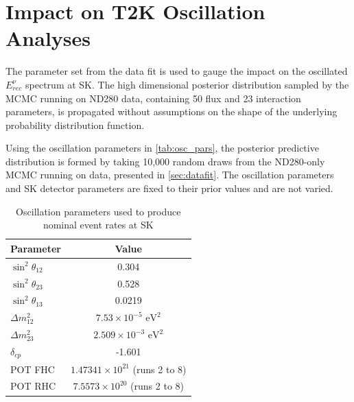 \section{Impact on T2K Oscillation Analyses}
The parameter set from the data fit is used to gauge the impact on the oscillated $E^\nu_{rec}$ spectrum at SK. The high dimensional posterior distribution sampled by the MCMC running on ND280 data, containing 50 flux and 23 interaction parameters, is propagated without assumptions on the shape of the underlying probability distribution function.

Using the oscillation parameters in \autoref{tab:osc_pars}, the posterior predictive distribution is formed by taking 10,000 random draws from the ND280-only MCMC running on data, presented in \autoref{sec:datafit}. The oscillation parameters and SK detector parameters are fixed to their prior values and are not varied.
\begin{table}[h]
	\begin{tabular}{l | c}
		\hline
		\hline
		Parameter & Value \\
		\hline
		$\sin^2\theta_{12}$ & 0.304 \\
		$\sin^2\theta_{23}$ & 0.528 \\
		$\sin^2\theta_{13}$ & 0.0219 \\
		$\Delta m^2_{12}$  & $7.53\times10^{-5} \text{ eV}^2$ \\
		$\Delta m^2_{23}$  & $2.509\times10^{-3} \text{ eV}^2$ \\
		$\delta_{cp}$ & -1.601 \\
		\hline
		POT FHC & $1.47341\times10^{21}$ (runs 2 to 8)\\ 
		POT RHC & $7.5573\times10^{20}$ (runs 2 to 8)\\
		\hline
		\hline
	\end{tabular}
\caption{Oscillation parameters used to produce nominal event rates at SK}
\label{tab:osc_pars}
\end{table}

